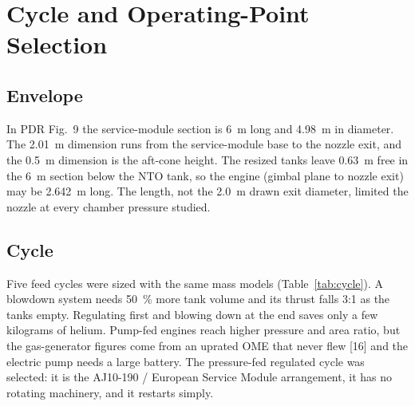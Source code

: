 \documentclass[10pt]{article}
\newcommand{\NLavail}{2.642}
\newcommand{\Nspare}{0.63}
\begin{document}
\section{Cycle and Operating-Point Selection}\label{sec:trade}
\subsection{Envelope}
In PDR Fig.~9 the service-module section is 6~m long and 4.98~m in diameter. The 2.01~m dimension runs from the
service-module base to the nozzle exit, and the 0.5~m dimension is the aft-cone height. The resized tanks leave \Nspare~m
free in the 6~m section below the NTO tank, so the engine (gimbal plane to nozzle exit) may be \NLavail~m long. The
length, not the 2.0~m drawn exit diameter, limited the nozzle at every chamber pressure studied.

\subsection{Cycle}
Five feed cycles were sized with the same mass models (Table~\ref{tab:cycle}). A blowdown system needs 50~\% more tank
volume and its thrust falls 3:1 as the tanks empty. Regulating first and blowing down at the end saves only a few
kilograms of helium. Pump-fed engines reach higher pressure and area ratio, but the gas-generator figures come from an
uprated OME that never flew [16] and the electric pump needs a large battery. The pressure-fed regulated cycle was
selected: it is the AJ10-190 / European Service Module arrangement, it has no rotating machinery, and it restarts simply.

\begin{table}[H]\centering\small\caption{Cycle trade (nominal efficiency).}\label{tab:cycle}\end{table}
\end{document}
